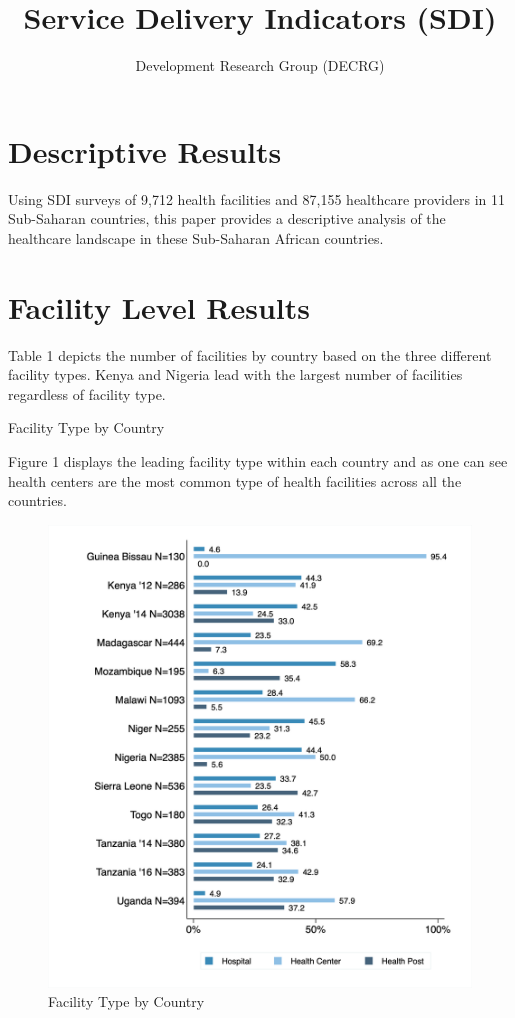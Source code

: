 \documentclass{article}                 %
\title{\color{NavyBlue} Service Delivery Indicators (SDI)}
\author{\color{NavyBlue}Development Research Group (DECRG)}
\begin{document}
	
	\maketitle        
	\sectionfont{\color{NavyBlue}}
	


	\section*{Descriptive Results}
	
	Using SDI surveys of 9,712 health facilities and 87,155 healthcare providers in 11 Sub-Saharan countries, this paper provides a descriptive analysis of the healthcare landscape in these Sub-Saharan African countries. 

 
	\section*{Facility Level Results}
	
	Table 1 depicts the number of facilities by country based on the three different facility types. Kenya and Nigeria lead with the largest number of facilities regardless of facility type. 
	
			\begin{table}[H]
				\centering
					\caption{Facility Type by Country}
					
			\end{table}
		
	Figure 1 displays the leading facility type within each country and as one can see health centers are the most common type of health facilities across all the countries. 	
		
			\begin{figure}[H] 
				\centering
					\caption{Facility Type  by Country} 
					\includegraphics[width=\textwidth]{"../Output/Final/Clinic_all"}
			\end{figure}
		
\end{document}
